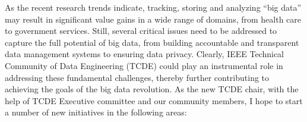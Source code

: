 \documentclass{article}
\begin{document}

As the recent research trends indicate, tracking, storing and analyzing “big data” may result in significant value gains in a wide range of domains, from health care to government services. Still, several critical issues need to be addressed to capture the full potential of big data, from building accountable and transparent data management systems to ensuring data privacy. Clearly, IEEE Technical Community of Data Engineering (TCDE) could play an instrumental role in addressing these fundamental challenges, thereby further contributing to achieving the goals of the big data revolution. As the new TCDE chair, with the help of TCDE Executive committee and our community members, I hope to start a number of new initiatives in the following areas:
\end{document}

